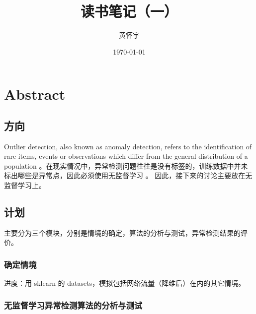 \documentclass[UTF8]{ctexart}
\title{读书笔记（一）}
\author{黄怀宇}
\date{\today}
\begin{document}
\maketitle

\section{Abstract}
    \subsection{方向}
        Outlier detection, also known as anomaly detection, refers to the identification of rare items, events or observations which differ from the general distribution of a population \cite{zhao2019pyod}。在现实情况中，异常检测问题往往是没有标签的，训练数据中并未标出哪些是异常点，因此必须使用无监督学习 \cite{link1}。 因此，接下来的讨论主要放在无监督学习上。%
    \subsection{计划}
        主要分为三个模块，分别是情境的确定，算法的分析与测试，异常检测结果的评价。
        \subsubsection{确定情境}
            进度：用 sklearn 的 datasets，模拟包括网络流量（降维后）在内的其它情境。
            

        \subsubsection{无监督学习异常检测算法的分析与测试} 
\end{document}
